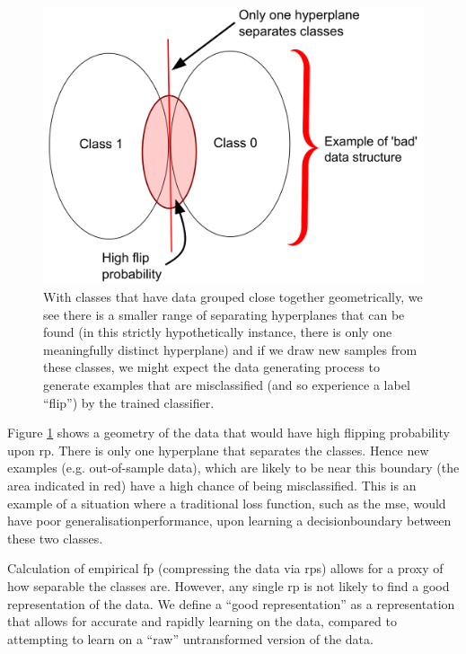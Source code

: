 \begin{figure}[H]
    \centering
    \includegraphics[width=\textwidth]{figs/hyperplanes_poor_classes.png}
    \caption[Illustration of poorly separated classes.]{With classes that have data grouped close together geometrically, we see there is a smaller range of separating hyperplanes that can be found (in this strictly hypothetically instance, there is only one meaningfully distinct hyperplane) and if we draw new samples from these classes, we might expect the data generating process to generate examples that are misclassified (and so experience a label \enquote{flip}) by the trained classifier.}
    \label{fig:poor_sep_classes}
\end{figure}

Figure \ref{fig:poor_sep_classes} shows a geometry of the data that would have high flipping probability upon \gls{rp}. There is only one \gls{hyperplane} that separates the classes. Hence new examples (e.g. out-of-sample data), which are likely to be near this boundary (the area indicated in red) have a high chance of being misclassified. This is an example of a situation where a traditional loss function, such as the \gls{mse}, would have poor \gls{generalisationperformance}, upon learning a \gls{decisionboundary} between these two classes. \bigskip

Calculation of empirical \gls{fp} (compressing the data via \gls{rp}s) allows for a proxy of how separable the classes are. However, any single \gls{rp} is not likely to find a good representation of the data. We define a \enquote{good representation} as a representation that allows for accurate and rapidly learning on the data, compared to attempting to learn on a \enquote{raw} untransformed version of the data.

